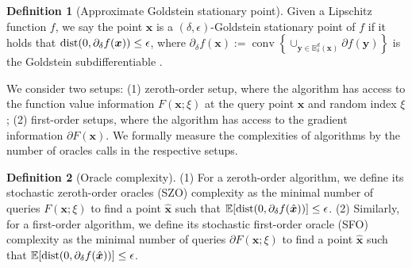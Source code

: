 \documentclass{article}
\def\vx{{\bm{x}}}
\def\vy{{\bm{y}}}
\def\sR{{\mathbb{R}}}
\newcommand{\E}{\mathbb{E}}
\newtheorem{prop}{Proposition}[section]
\theoremstyle{definition}
\newtheorem{dfn}{Definition}[section]
\theoremstyle{remark}
\begin{document}
	\begin{dfn}[Approximate Goldstein stationary point] \label{dfn:Goldsta}
		Given a Lipschitz function $f$, we say the point $\vx$ is a $(\delta,\epsilon)$-Goldstein stationary point of $f$ if it holds that ${\rm dist}(0, \partial_{\delta} f(\vx))  \leq \epsilon$, %
		where $\partial_{\delta} f(\vx):=\operatorname{conv}\left\{\cup_{\vy \in \mathbb{B}_{\delta}^d(\vx)} \partial f(\vy)\right\}$ is the Goldstein subdifferentiable \citep{goldstein1977optimization}.
	\end{dfn}
	
	We consider two setups: (1) zeroth-order setup, where the algorithm has access to the function value information $F(\vx;\xi)$ at the query point $\vx$ and random index $\xi$; (2) first-order setups, where the algorithm has access to the gradient information $\partial F(\vx)$. We formally measure the complexities of algorithms by the number of oracles calls in the respective setups.
	\begin{dfn}[Oracle complexity] \label{dfn:complexity}
		(1) For a zeroth-order algorithm, we define its stochastic zeroth-order oracles (SZO) complexity as the minimal number of queries $F(\vx;\xi)$ to find a point $\hat \vx$ such that $\E [{\rm dist}(0, \partial_{\delta} f(\hat \vx))]  \leq \epsilon$. (2) Similarly, for a first-order algorithm, we define its stochastic first-order oracle (SFO) complexity as the minimal number of queries $\partial F(\vx;\xi)$ to find a point $\hat \vx$ such that $\E[{\rm dist}(0, \partial_{\delta} f(\hat \vx))]  \leq \epsilon$. 
	\end{dfn}
	
	
	
\end{document}
